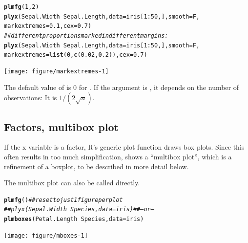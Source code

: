 \documentclass[11pt]{article}\usepackage[]{graphicx}\usepackage[]{color}
\makeatletter
\newcommand{\hlnum}[1]{\textcolor[rgb]{0.686,0.059,0.569}{#1}}%
\newcommand{\hlcom}[1]{\textcolor[rgb]{0.678,0.584,0.686}{\textit{#1}}}%
\newcommand{\hlopt}[1]{\textcolor[rgb]{0,0,0}{#1}}%
\newcommand{\hlstd}[1]{\textcolor[rgb]{0.345,0.345,0.345}{#1}}%
\newcommand{\hlkwc}[1]{\textcolor[rgb]{0.333,0.667,0.333}{#1}}%
\newcommand{\hlkwd}[1]{\textcolor[rgb]{0.737,0.353,0.396}{\textbf{#1}}}%
\newenvironment{kframe}{%
 \def\at@end@of@kframe{}%
 \ifinner\ifhmode%
  \def\at@end@of@kframe{\end{minipage}}%
  \begin{minipage}{\columnwidth}%
 \fi\fi%
 \def\FrameCommand##1{\hskip\@totalleftmargin \hskip-\fboxsep
 \colorbox{shadecolor}{##1}\hskip-\fboxsep
     \hskip-\linewidth \hskip-\@totalleftmargin \hskip\columnwidth}%
 \MakeFramed {\advance\hsize-\width
   \@totalleftmargin\z@ \linewidth\hsize
   \@setminipage}}%
 {\par\unskip\endMakeFramed%
 \at@end@of@kframe}
\newenvironment{knitrout}{}{} %
\makeatother
\begin{document}
\begin{knitrout}
\color{fgcolor}\begin{kframe}
\begin{alltt}
\hlkwd{plmfg}\hlstd{(}\hlnum{1}\hlstd{,}\hlnum{2}\hlstd{)}
\hlkwd{plyx}\hlstd{(Sepal.Width}\hlopt{~}\hlstd{Sepal.Length,} \hlkwc{data}\hlstd{=iris[}\hlnum{1}\hlopt{:}\hlnum{50}\hlstd{,],} \hlkwc{smooth}\hlstd{=F,}
     \hlkwc{markextremes}\hlstd{=}\hlnum{0.1}\hlstd{,} \hlkwc{cex}\hlstd{=}\hlnum{0.7}\hlstd{)}
\hlcom{## different proportions marked in different margins:}
\hlkwd{plyx}\hlstd{(Sepal.Width}\hlopt{~}\hlstd{Sepal.Length,} \hlkwc{data}\hlstd{=iris[}\hlnum{1}\hlopt{:}\hlnum{50}\hlstd{,],} \hlkwc{smooth}\hlstd{=F,}
     \hlkwc{markextremes}\hlstd{=}\hlkwd{list}\hlstd{(}\hlnum{0}\hlstd{,}\hlkwd{c}\hlstd{(}\hlnum{0.02}\hlstd{,}\hlnum{0.2}\hlstd{)),} \hlkwc{cex}\hlstd{=}\hlnum{0.7}\hlstd{)}
\end{alltt}
\end{kframe}
\texttt{[image: figure/markextremes-1]} 

\end{knitrout}
The default value of  is 0 for .
If the argument is , it depends on the number of 
observations: It is $1/(2\sqrt{n})$. 

\subsection{Factors, multibox plot}
If the x variable is a factor, R's generic plot function draws box plots.
Since this often results in too much simplification,  shows a 
``multibox plot'', which is a refinement of a boxplot, to be described in
more detail below.

The multibox plot can also be called directly.
\begin{knitrout}
\color{fgcolor}\begin{kframe}
\begin{alltt}
\hlkwd{plmfg}\hlstd{()}  \hlcom{## reset to just 1 figure per plot}
\hlcom{## plyx(Sepal.Width~Species, data=iris)  ## -- or --}
\hlkwd{plmboxes}\hlstd{(Petal.Length}\hlopt{~}\hlstd{Species,} \hlkwc{data}\hlstd{=iris)}
\end{alltt}
\end{kframe}
\texttt{[image: figure/mboxes-1]} 

\end{knitrout}
\end{document}
